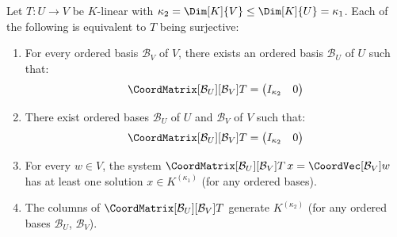 \begin{theorem}
\label{thm:mat-surj}
    Let $T: U \to V$ be $K$-linear with $\kappa_2 = \Dim[K]{V} \leq \Dim[K]{U} = \kappa_1$.
    Each of the following is equivalent to $T$ being surjective:
    \begin{enumerate}
        \item For every ordered basis $\mathcal{B}_V$ of $V$, there exists an ordered basis
              $\mathcal{B}_U$ of $U$ such that:
              \[
                  \CoordMatrix[\mathcal{B}_U][\mathcal{B}_V]{T}
                  = \begin{pmatrix} I_{\kappa_2} & 0 \end{pmatrix}
              \]
        \item There exist ordered bases $\mathcal{B}_U$ of $U$ and $\mathcal{B}_V$ of $V$
              such that:
              \[
                  \CoordMatrix[\mathcal{B}_U][\mathcal{B}_V]{T}
                  = \begin{pmatrix} I_{\kappa_2} & 0 \end{pmatrix}
              \]
        \item For every $w \in V$, the system
              $\CoordMatrix[\mathcal{B}_U][\mathcal{B}_V]{T}\, x = \CoordVec[\mathcal{B}_V]{w}$
              has at least one solution $x \in K^{(\kappa_1)}$ (for any ordered bases).
        \item The columns of $\CoordMatrix[\mathcal{B}_U][\mathcal{B}_V]{T}$ generate
              $K^{(\kappa_2)}$ (for any ordered bases $\mathcal{B}_U$, $\mathcal{B}_V$).
    \end{enumerate}
\end{theorem}

